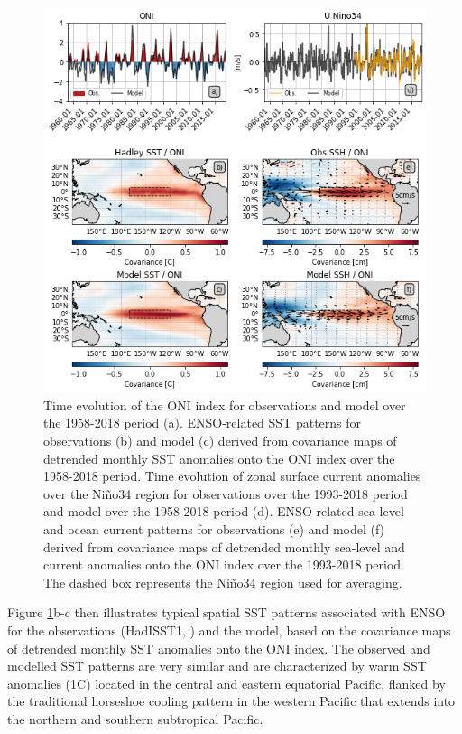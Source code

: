 \begin{figure}[h!tp]
	\centering
	\includegraphics[scale=0.6]{figs/fig1.png}
	\caption{Time evolution of the ONI index for observations and model over the 1958-2018 period (a). ENSO-related SST patterns for observations \citep{raynerGlobalAnalysesSea2003} (b) and model (c) derived from covariance maps of detrended monthly SST anomalies onto the ONI index over the 1958-2018 period. Time evolution of zonal surface current anomalies over the Niño34 region for observations over the 1993-2018 period \citep{rioGOCEOceanCirculation2014} and model over the 1958-2018 period (d). ENSO-related sea-level and ocean current patterns for observations (e) and model (f) derived from covariance maps of detrended monthly sea-level and current anomalies onto the ONI index over the 1993-2018 period. The dashed box represents the Niño34 region used for averaging.}
	\label{fig:nemo-had-sst}
\end{figure}

Figure \ref{fig:nemo-had-sst}b-c then illustrates typical spatial SST patterns associated with ENSO for the observations (HadISST1, \citealp{raynerGlobalAnalysesSea2003}) and the model, based on the covariance maps of detrended monthly SST anomalies onto the ONI index. The observed and modelled SST patterns are very similar and are characterized by warm SST anomalies (1\degree{}C) located in the central and eastern equatorial Pacific, flanked by the traditional horseshoe cooling pattern in the western Pacific that extends into the northern and southern subtropical Pacific.    


